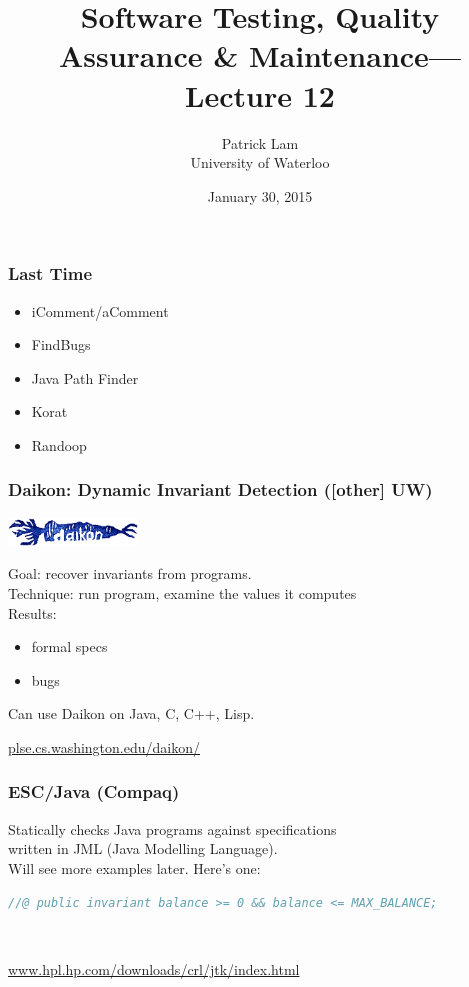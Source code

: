 \documentclass{beamer}
\title{Software Testing, Quality Assurance \& Maintenance---Lecture 12}
\author{Patrick Lam\\University of Waterloo}
\date{January 30, 2015}
\newenvironment{changemargin}[1]{%
  \begin{list}{}{%
    \setlength{\topsep}{0pt}%
    \setlength{\leftmargin}{#1}%
    \setlength{\rightmargin}{1em}
    \setlength{\listparindent}{\parindent}%
    \setlength{\itemindent}{\parindent}%
    \setlength{\parsep}{\parskip}%
  }%
  \item[]}{\end{list}}
\begin{document}
\begin{frame}
  \titlepage
\end{frame}

\begin{frame}
  \frametitle{Last Time}
  \begin{changemargin}{2cm}
    \begin{itemize}
    \item iComment/aComment
    \item FindBugs
    \item Java Path Finder
    \item Korat
    \item Randoop
    \end{itemize}
  \end{changemargin}
\end{frame}

\begin{frame}
  \frametitle{Daikon: Dynamic Invariant Detection ([other] UW)}
  \includegraphics[height=2em]{L11/daikon-logo}
  \begin{changemargin}{2cm}
    Goal: recover invariants from programs.\\[1em]
    Technique: run program, examine the values it computes\\[2em]
    Results:
    \begin{itemize}
    \item formal specs
    \item bugs
    \end{itemize}
    Can use Daikon on Java, C, C++, Lisp.\\[1em]
  \end{changemargin}
  \begin{center}
    \url{plse.cs.washington.edu/daikon/}\\
  \end{center}
\end{frame}
    
\begin{frame}[fragile]
  \frametitle{ESC/Java (Compaq)}
  \begin{changemargin}{2cm}
    Statically checks Java programs against specifications\\
    written in JML (Java Modelling Language).\\[1em]
    Will see more examples later. Here's one:\\
    \begin{lstlisting}[language=Java]
      //@ public invariant balance >= 0 && balance <= MAX_BALANCE;
    \end{lstlisting}
    ~\\[1em]
  \end{changemargin}
  \begin{center}
    \url{www.hpl.hp.com/downloads/crl/jtk/index.html}
  \end{center}
\end{frame}
\end{document}
